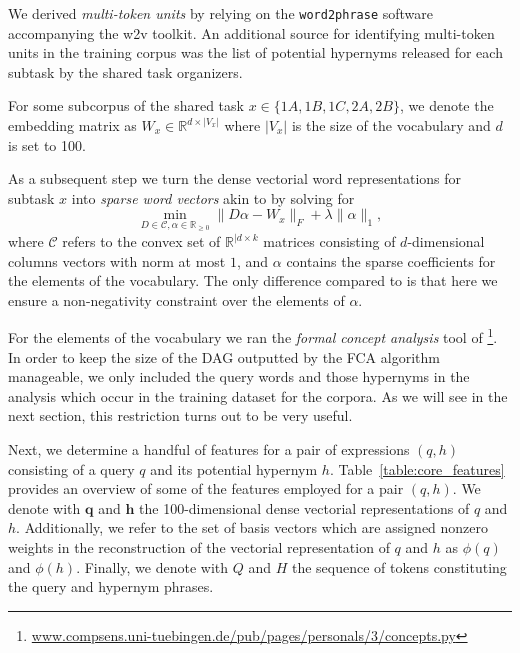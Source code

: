 \documentclass[11pt,a4paper]{article}
\begin{document}
We derived \emph{multi-token units} by relying on the \texttt{word2phrase} software accompanying the w2v toolkit. An additional source for identifying multi-token units in the training corpus was the list of potential hypernyms released for each subtask by the shared task organizers.

For some subcorpus of the shared task $x\in\{1A, 1B, 1C, 2A, 2B\}$, we denote
the embedding matrix as $W_x \in \mathbb{R}^{d \times \lvert V_x \rvert}$ where
$\lvert V_x \rvert$ is the size of the vocabulary and $d$ is set to 100.

As a subsequent step we turn the dense vectorial word representations for subtask $x$ into
\emph{sparse word vectors} akin to \citet{Berend:2017} by solving for
\begin{equation}
\min\limits_{D \in \mathcal{C}, \alpha \in \mathbb{R}_{\geq0}} \lVert D\alpha - W_{x} \rVert_F + \lambda \lVert \alpha \rVert_1,
\label{nonneg_SPAMS_objective}
\end{equation}
where $\mathcal{C}$ refers to the convex set of $\mathbb{R}^{\lvert d \times k}$ matrices consisting of $d$-dimensional columns vectors
with norm at most $1$, and $\alpha$ contains the sparse coefficients for the elements of the vocabulary. The only difference
compared to \citet{Berend:2017} is that here we ensure a non-negativity
constraint over the elements of $\alpha$.

For the elements of the vocabulary we ran the \emph{formal concept analysis} tool of
\citet{Endres:2010}\footnote{\url{www.compsens.uni-tuebingen.de/pub/pages/personals/3/concepts.py}}.
In order to keep the size of the DAG outputted by the FCA algorithm manageable,
we only included the query words and those hypernyms in the analysis which
occur in the training dataset for the corpora.
As we will see in the next section, this restriction turns out to be very useful.


Next, we determine a handful of features for a pair of expressions $(q, h)$
consisting of a query $q$ and its potential hypernym $h$.
Table~\ref{table:core_features} provides an overview of some of the features
employed for a pair $(q, h)$.
We denote with $\mathbf{q}$ and $\mathbf{h}$ the 100-dimensional dense
vectorial representations of $q$ and $h$.
Additionally, we refer to the set of basis vectors which are assigned nonzero
weights in the reconstruction of the vectorial representation of $q$ and $h$ as
$\phi(q)$ and $\phi(h)$.
Finally, we denote with $Q$ and $H$ the sequence of tokens constituting the
query and hypernym phrases.
\end{document}
